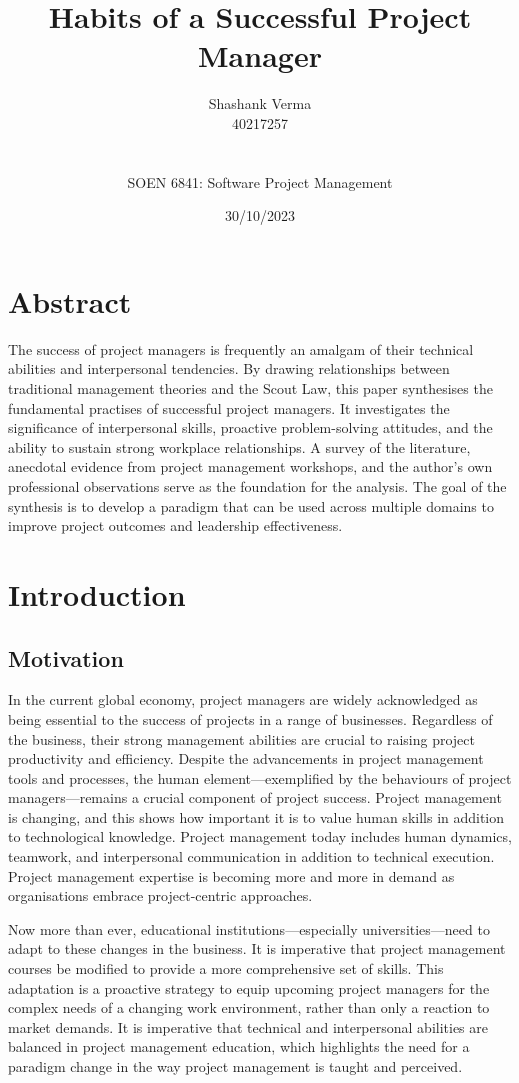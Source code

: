 \documentclass{article}
\title{Habits of a Successful Project Manager}
\author{Shashank Verma \\ 40217257
\\
\\
\\
SOEN 6841: Software Project Management}
\date{30/10/2023}
\begin{document}
\maketitle
{}

\newpage
\tableofcontents
\newpage
{}

\section{Abstract}
The success of project managers is frequently an amalgam of their technical abilities and interpersonal tendencies. By drawing relationships between traditional management theories and the Scout Law, this paper synthesises the fundamental practises of successful project managers. It investigates the significance of interpersonal skills, proactive problem-solving attitudes, and the ability to sustain strong workplace relationships. A survey of the literature, anecdotal evidence from project management workshops, and the author's own professional observations serve as the foundation for the analysis. The goal of the synthesis is to develop a paradigm that can be used across multiple domains to improve project outcomes and leadership effectiveness.

\section{Introduction}
\subsection{Motivation}
In the current global economy, project managers are widely acknowledged as being essential to the success of projects in a range of businesses. Regardless of the business, their strong management abilities are crucial to raising project productivity and efficiency. Despite the advancements in project management tools and processes, the human element—exemplified by the behaviours of project managers—remains a crucial component of project success. Project management is changing, and this shows how important it is to value human skills in addition to technological knowledge. Project management today includes human dynamics, teamwork, and interpersonal communication in addition to technical execution. Project management expertise is becoming more and more in demand as organisations embrace project-centric approaches.

Now more than ever, educational institutions—especially universities—need to adapt to these changes in the business. It is imperative that project management courses be modified to provide a more comprehensive set of skills. This adaptation is a proactive strategy to equip upcoming project managers for the complex needs of a changing work environment, rather than only a reaction to market demands. It is imperative that technical and interpersonal abilities are balanced in project management education, which highlights the need for a paradigm change in the way project management is taught and perceived.
\end{document}
